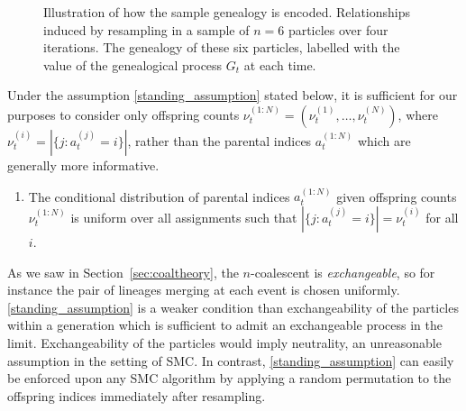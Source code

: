 \begin{figure}[ht]
{
\label{fig:encoding_b}
}
\caption[Encoding the sample genealogy]{Illustration of how the sample genealogy is encoded.  Relationships induced by resampling in a sample of $n=6$ particles over four iterations.  The genealogy of these six particles, labelled with the value of the genealogical process $G_t$ at each time.}
\label{fig:encoding_genealogy}
\end{figure}

Under the assumption \ref{standing_assumption} stated below, it is sufficient for our purposes to consider only offspring counts $\nu_t^{(1:N)} = (\nu_t^{(1)},\dots,\nu_t^{(N)})$, where $\nu_t^{(i)} = |\{ j: a_t^{(j)} =i \}|$, rather than the parental indices $a_t^{(1:N)}$ which are generally more informative.
\begin{enumerate}[label=(A\arabic*)]
\item\label{standing_assumption} The conditional distribution of parental indices $a_t^{(1:N)}$ given offspring counts $\nu_t^{(1:N)}$ is uniform over all assignments such that $ |\{ j: a_t^{(j)} =i \}|= \nu_t^{(i)} $ for all $i$.
\end{enumerate}
As we saw in Section~\ref{sec:coaltheory}, the $n$-coalescent is \emph{exchangeable}, so for instance the pair of lineages merging at each event is chosen uniformly. 
\ref{standing_assumption} is a weaker condition than exchangeability of the particles within a generation which is sufficient to admit an exchangeable process in the limit.
Exchangeability of the particles would imply neutrality, an unreasonable assumption in the setting of SMC. 
In contrast, \ref{standing_assumption} can easily be enforced upon any SMC algorithm by applying a random permutation to the offspring indices immediately after resampling.





